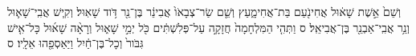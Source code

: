 \documentclass{openreader}
\begin{document}
וְשֵׁם֙ אֵ֣שֶׁת שָׁא֔וּל אֲחִינֹ֖עַם בַּת־אֲחִימָ֑עַץ וְשֵׁ֤ם שַׂר־צְבָאֹו֙ אֲבִינֵ֔ר בֶּן־נֵ֖ר דֹּ֥וד שָׁאֽוּל׃ 
וְקִ֧ישׁ אֲבִֽי־שָׁא֛וּל וְנֵ֥ר אֲבִֽי־אַבְנֵ֖ר בֶּן־אֲבִיאֵֽל׃ ס 
וַתְּהִ֤י הַמִּלְחָמָה֙ חֲזָקָ֣ה עַל־פְּלִשְׁתִּ֔ים כֹּ֖ל יְמֵ֣י שָׁא֑וּל וְרָאָ֨ה שָׁא֜וּל כָּל־אִ֤ישׁ גִּבֹּור֙ וְכָל־בֶּן־חַ֔יִל וַיַּאַסְפֵ֖הוּ אֵלָֽיו׃ ס 
\end{document}

